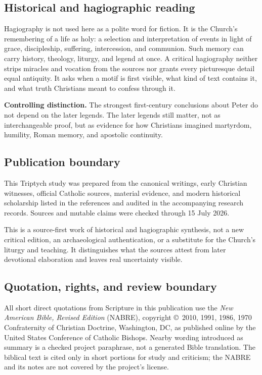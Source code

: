 \subsection{Historical and hagiographic reading}

Hagiography is not used here as a polite word for fiction. It is the Church's
remembering of a life as holy: a selection and interpretation of events in
light of grace, discipleship, suffering, intercession, and communion. Such
memory can carry history, theology, liturgy, and legend at once. A critical
hagiography neither strips miracles and vocation from the sources nor grants
every picturesque detail equal antiquity. It asks when a motif is first
visible, what kind of text contains it, and what truth Christians meant to
confess through it.

\begin{studyframe}
\textbf{Controlling distinction.} The strongest first-century conclusions
about Peter do not depend on the later legends. The later legends still
matter, not as interchangeable proof, but as evidence for how Christians
imagined martyrdom, humility, Roman memory, and apostolic continuity.
\end{studyframe}

\subsection{Publication boundary}

This Triptych study was prepared from the canonical writings, early Christian
witnesses, official Catholic sources, material evidence, and modern historical
scholarship listed in the references and audited in the accompanying research
records. Sources and mutable claims were checked through 15 July 2026.

This is a source-first work of historical and hagiographic synthesis, not a new
critical edition, an archaeological authentication, or a substitute for the
Church's liturgy and teaching. It distinguishes what the sources attest from
later devotional elaboration and leaves real uncertainty visible.

\subsection{Quotation, rights, and review boundary}

All short direct quotations from Scripture in this publication use the
\emph{New American Bible, Revised Edition} (NABRE), copyright \copyright\ 2010,
1991, 1986, 1970 Confraternity of Christian Doctrine, Washington, DC, as
published online by the United States Conference of Catholic Bishops. Nearby
wording introduced as summary is a checked project paraphrase, not a generated
Bible translation. The biblical text is cited only in short portions for
study and criticism; the NABRE and its notes are not covered by the project's
license.

